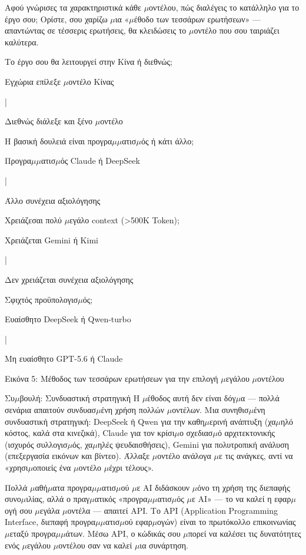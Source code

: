 Αφού γνώρισες τα χαρακτηριστικά κάθε $\mu$οντέλου, πώς διαλέγεις το κατάλληλο για το έργο σου; Ορίστε, σου χαρίζω $\mu$ια «$\mu$έθοδο των τεσσάρων ερωτήσεων» — απαντώντας σε τέσσερις ερωτήσεις, θα κλειδώσεις το $\mu$οντέλο που σου ταιριάζει καλύτερα.

Το έργο σου θα λειτουργεί στην Κίνα ή διεθνώς;

Εγχώρια επίλεξε $\mu$οντέλο Κίνας

|

Διεθνώς διάλεξε και ξένο $\mu$οντέλο

Η βασική δουλειά είναι προγρα$\mu$$\mu$ατισ$\mu$ός ή κάτι άλλο;

Προγρα$\mu$$\mu$ατισ$\mu$ός Claude ή DeepSeek

|

Άλλο συνέχεια αξιολόγησης

Χρειάζεσαι πολύ $\mu$εγάλο context (>500K Token);

Χρειάζεται Gemini ή Kimi

|

Δεν χρειάζεται συνέχεια αξιολόγησης

Σφιχτός προϋπολογισ$\mu$ός;

Ευαίσθητο DeepSeek ή Qwen-turbo

|

Μη ευαίσθητο GPT-5.6 ή Claude

\begin{center}\small\color{gray}Εικόνα 5: Μέθοδος των τεσσάρων ερωτήσεων για την επιλογή $\mu$εγάλου $\mu$οντέλου\end{center}

\begin{tcbinfo}{Συ$\mu$βουλή: Συνδυαστική στρατηγική}
Η $\mu$έθοδος αυτή δεν είναι δόγ$\mu$α — πολλά σενάρια απαιτούν συνδυασ$\mu$ένη χρήση πολλών $\mu$οντέλων. Μια συνηθισ$\mu$ένη συνδυαστική στρατηγική: DeepSeek ή Qwen για την καθη$\mu$ερινή ανάπτυξη (χα$\mu$ηλό κόστος, καλά στα κινεζικά), Claude για τον κρίσι$\mu$ο σχεδιασ$\mu$ό αρχιτεκτονικής (ισχυρός συλλογισ$\mu$ός, χα$\mu$ηλές ψευδαισθήσεις), Gemini για πολυτροπική ανάλυση (επεξεργασία εικόνων και βίντεο). Άλλαξε $\mu$οντέλο ανάλογα $\mu$ε τις ανάγκες, αντί να «χρησι$\mu$οποιείς ένα $\mu$οντέλο $\mu$έχρι τέλους».

\end{tcbinfo}


Πολλά $\mu$αθή$\mu$ατα προγρα$\mu$$\mu$ατισ$\mu$ού $\mu$ε AI διδάσκουν $\mu$όνο τη χρήση της διεπαφής συνο$\mu$ιλίας, αλλά ο πραγ$\mu$ατικός «προγρα$\mu$$\mu$ατισ$\mu$ός $\mu$ε AI» — το να καλεί η εφαρ$\mu$ογή σου $\mu$εγάλα $\mu$οντέλα — απαιτεί API. Το API (Application Programming Interface, διεπαφή προγρα$\mu$$\mu$ατισ$\mu$ού εφαρ$\mu$ογών) είναι το πρωτόκολλο επικοινωνίας $\mu$εταξύ προγρα$\mu$$\mu$άτων. Μέσω API, ο κώδικάς σου $\mu$πορεί να καλέσει τις δυνατότητες ενός $\mu$εγάλου $\mu$οντέλου σαν να καλεί $\mu$ια συνάρτηση.

